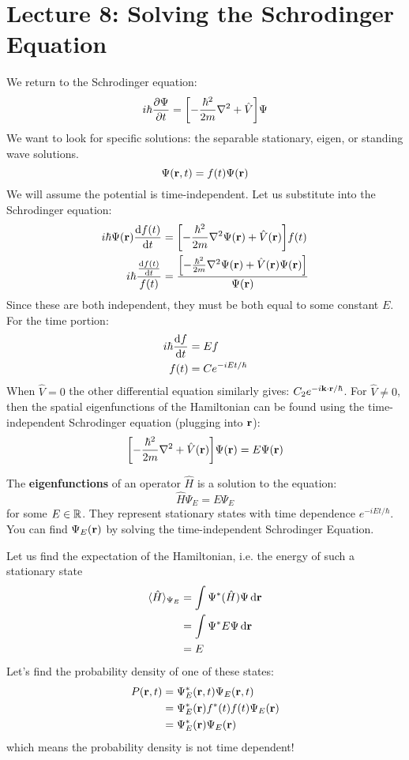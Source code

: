\section{Lecture 8: Solving the Schrodinger Equation}

We return to the Schrodinger equation:
\[ i \hbar \partialderivative{\Psi}{t} = \qty[- \frac{\hbar^2}{2m} \nabla^2 + \hat{V}] \Psi \]
We want to look for specific solutions: the separable stationary, eigen, or standing wave solutions. 
\[ \Psi(\mathbf{r}, t) = f(t) \Psi(\mathbf{r}) \]
We will assume the potential is time-independent. Let us substitute into the Schrodinger equation:
\begin{align*}
    i \hbar \Psi(\mbf{r}) \derivative{f(t)}{t} &= \qty[- \frac{\hbar^2}{2m} \nabla^2 \Psi(\mbf{r}) + \hat{V}(\mbf{r})] f(t) \\
    i \hbar \frac{\derivative{f(t)}{t}}{f(t)} &= \frac{\qty[- \frac{\hbar^2}{2m} \nabla^2 \Psi(\mbf{r}) + \hat{V}(\mbf{r}) \Psi(\mbf{r})]}{\Psi(\mbf{r})}
\end{align*}
Since these are both independent, they must be both equal to some constant $E$. For the time portion:
\begin{align*}
    i \hbar \derivative{f}{t} &= Ef \\
    f(t) &= Ce^{-iEt/\hbar}
\end{align*}
When $\hat{V} = 0$ the other differential equation similarly gives: $C_2e^{-i\mathbf{k}\cdot\mathbf{r}/\hbar}$. For $\hat{V} \neq 0$, then the spatial
eigenfunctions of the Hamiltonian can be found using the time-independent Schrodinger equation (plugging into $\mathbf{r}$):
\[ \qty[-\frac{\hbar^2}{2m} \nabla^2 + \hat{V}(\mathbf{r})] \Psi(\mathbf{r}) = E \Psi(\mathbf{r}) \]
\begin{definition}[Eigenfunctions]
    The \textbf{eigenfunctions} of an operator $\hat{H}$ is a solution to the equation:
    \[ \hat{H} \Psi_E = E \Psi_E \]
    for some $E \in \operatorname{\mathbb{R}}$. They represent stationary states with time dependence $e^{-iEt/\hbar}$. You can find
    $\Psi_E(\mathbf{r})$ by solving the time-independent Schrodinger Equation.
\end{definition}
Let us find the expectation of the Hamiltonian, i.e. the energy of such a stationary state
\begin{align*}
    \langle \hat{H} \rangle_{\Psi_E} &= \int \Psi^* (\hat{H}) \Psi \dd{\mathbf{r}} \\
    &= \int \Psi^* E \Psi \dd{\mathbf{r}} \\
    &= E
\end{align*}
Let's find the probability density of one of these states:
\begin{align*}
    P(\mathbf{r}, t) &= \Psi_E^*(\mathbf{r}, t) \Psi_E(\mathbf{r}, t) \\
    &= \Psi_E^*(\mathbf{r}) f^*(t) f(t) \Psi_E(\mathbf{r}) \\
    &= \Psi_E^*(\mathbf{r}) \Psi_E(\mathbf{r})
\end{align*}
which means the probability density is not time dependent! 
